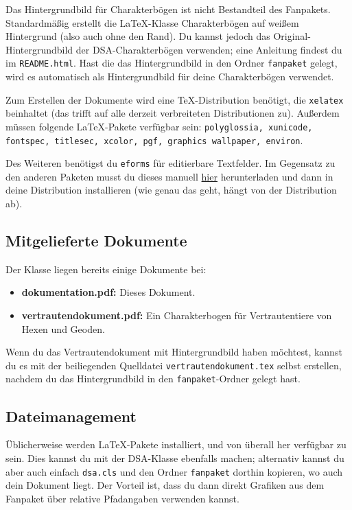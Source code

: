 \documentclass{dsa}
\begin{document}
  Das Hintergrundbild für Charakterbögen ist nicht Bestandteil des Fanpakets.
  Standardmäßig erstellt die \LaTeX-Klasse Charakterbögen auf weißem Hintergrund
  (also auch ohne den Rand). Du kannst jedoch das Original-Hintergrundbild der
  DSA-Charakterbögen verwenden; eine Anleitung findest du im
  \texttt{README.html}. Hast die das Hintergrundbild in den Ordner 
  \texttt{fanpaket} gelegt, wird es automatisch als Hintergrundbild für deine
  Charakterbögen verwendet.
  
  Zum Erstellen der Dokumente wird eine TeX-Distribution benötigt, die
  \texttt{xelatex} beinhaltet (das trifft auf alle derzeit verbreiteten
  Distributionen zu). Außerdem müssen folgende LaTeX-Pakete verfügbar sein:
  \texttt{polyglossia, xunicode, fontspec, titlesec, xcolor, pgf, graphics
   wallpaper, environ}.
  
  Des Weiteren benötigst du \texttt{eforms} für editierbare Textfelder.
  Im Gegensatz zu den anderen Paketen musst du dieses manuell
  \href{http://www.ctan.org/pkg/eforms}{hier} herunterladen und dann in deine
  Distribution installieren (wie genau das geht, hängt von der Distribution ab).
  
  \subsection*{Mitgelieferte Dokumente}
  
  Der Klasse liegen bereits einige Dokumente bei:
  
  \begin{itemize}
    \item \textbf{dokumentation.pdf:} Dieses Dokument.
    \item \textbf{vertrautendokument.pdf:} Ein Charakterbogen für
      Vertrautentiere von Hexen und Geoden.
  \end{itemize}
  
  Wenn du das Vertrautendokument mit Hintergrundbild haben möchtest, kannst du
  es mit der beiliegenden Quelldatei \texttt{vertrautendokument.tex} selbst
  erstellen, nachdem du das Hintergrundbild in den \texttt{fanpaket}-Ordner
  gelegt hast.
  
  \subsection*{Dateimanagement}
  
  Üblicherweise werden \LaTeX-Pakete installiert, und von überall her
  verfügbar zu sein. Dies kannst du mit der DSA-Klasse ebenfalls machen;
  alternativ kannst du aber auch einfach \texttt{dsa.cls} und den Ordner
  \texttt{fanpaket} dorthin kopieren, wo auch dein Dokument liegt. Der
  Vorteil ist, dass du dann direkt Grafiken aus dem Fanpaket über relative
  Pfadangaben verwenden kannst.
  
\end{document}
